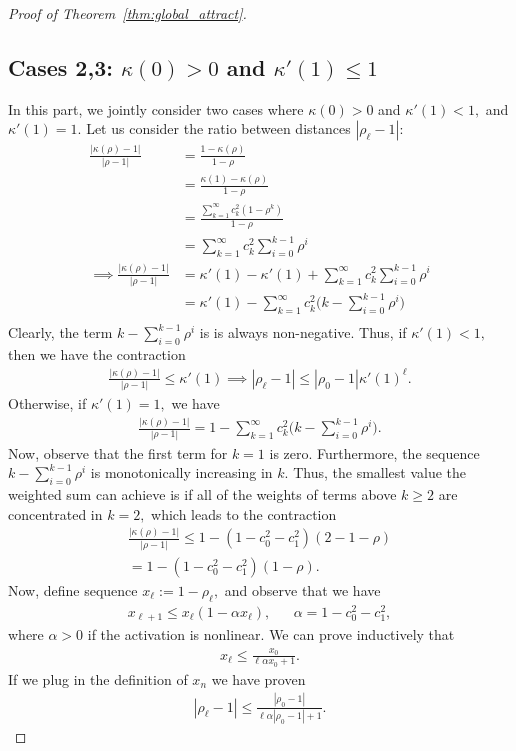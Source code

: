 \documentclass[twoside]{article}
\theoremstyle{definition}
\begin{document}
\begin{proof}[Proof of Theorem~\ref{thm:global_attract}]
\subsection*{Cases 2,3: $\kappa(0)>0$ and $\kappa'(1)\le 1$} In this part, we jointly consider two cases where $\kappa(0)>0$ and $\kappa'(1) < 1,$ and $\kappa'(1)=1.$ Let us consider the ratio between distances $|\rho_\ell-1|$:
\begin{align*}
    \frac{|\kappa(\rho)-1|}{|\rho-1|} &= \frac{1-\kappa(\rho)}{1-\rho} \\
    &=\frac{\kappa(1)-\kappa(\rho)}{1-\rho}\\
    &=\frac{\sum_{k=1}^\infty c_k^2 (1-\rho^k)}{1-\rho}\\
    &=\sum_{k=1}^\infty c_k^2 \sum_{i=0}^{k-1}\rho^i\\
\implies \frac{|\kappa(\rho)-1|}{|\rho-1|} &=\kappa'(1)-\kappa'(1)+\sum_{k=1}^\infty c_k^2 \sum_{i=0}^{k-1} \rho^i\\
&= \kappa'(1)-\sum_{k=1}^\infty c_k^2 \big(k-\sum_{i=0}^{k-1} \rho^i\big)\\
\end{align*}
Clearly, the term $k-\sum_{i=0}^{k-1} \rho^i$ is is always non-negative. Thus, if $\kappa'(1)<1,$ then we have the contraction 
\begin{align*}
    \frac{|\kappa(\rho)-1|}{|\rho-1|} \le \kappa'(1) \implies |\rho_\ell-1| \le |\rho_0-1| \kappa'(1)^\ell.
\end{align*}
Otherwise, if $\kappa'(1)=1,$ we have 
\begin{align*}
    \frac{|\kappa(\rho)-1|}{|\rho-1|} = 1-\sum_{k=1}^\infty c_k^2 \big(k-\sum_{i=0}^{k-1} \rho^i\big).
\end{align*}
Now, observe that the first term for $k=1$ is zero. Furthermore, the sequence $k-\sum_{i=0}^{k-1}\rho^i$ is monotonically increasing in $k$. Thus, the smallest value the weighted sum can achieve is if all of the weights of terms above $k\ge 2$ are concentrated in $k=2,$ which leads to the contraction
\begin{align*}
    \frac{|\kappa(\rho)-1|}{|\rho-1|} \le 1-(1-c_0^2-c_1^2)(2-1-\rho) \\
    = 1- (1-c_0^2-c_1^2) (1-\rho).
\end{align*}
Now, define sequence $x_\ell:= 1-\rho_\ell,$ and observe that we have 
\begin{align*}
    x_{\ell+1} \le x_\ell (1-\alpha x_\ell), && \alpha = 1-c_0^2-c_1^2,
\end{align*}
where $\alpha > 0$ if the activation is nonlinear. 
We can prove inductively that 
\begin{align*}
x_\ell\le \frac{x_0}{\ell\alpha x_0 + 1}.
\end{align*}
If we plug in the definition of $x_n$ we have proven
\begin{align*}
|\rho_\ell-1| \le \frac{|\rho_0-1|}{\ell \alpha |\rho_0-1| + 1}.
\end{align*}


\end{proof}
\end{document}
